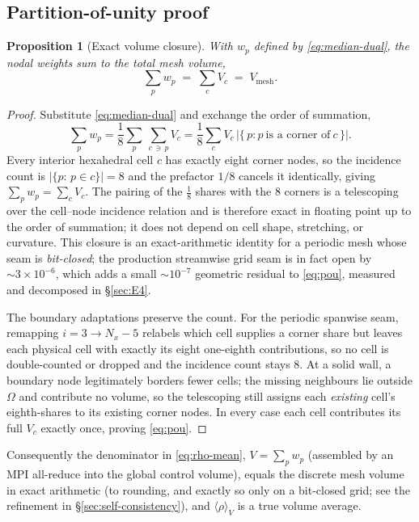 \documentclass[11pt]{article}
\newtheorem{proposition}{Proposition}
\theoremstyle{definition}
\theoremstyle{remark}
\begin{document}
\subsection{Partition-of-unity proof}
\label{sec:T3-pou}
\begin{proposition}[Exact volume closure]
\label{prop:pou}
With $w_p$ defined by \eqref{eq:median-dual}, the nodal weights sum to the total
mesh volume,
\begin{equation}
\sum_{p} w_p \;=\; \sum_{c} V_c \;=\; V_{\mathrm{mesh}} .
\label{eq:pou}
\end{equation}
\end{proposition}
\begin{proof}
Substitute \eqref{eq:median-dual} and exchange the order of summation,
\begin{equation}
\sum_{p} w_p
=\frac{1}{8}\sum_{p}\ \sum_{c\,\ni\,p} V_c
=\frac{1}{8}\sum_{c} V_c\,\bigl|\{\,p : p\ \text{is a corner of}\ c\,\}\bigr| .
\label{eq:pou-swap}
\end{equation}
Every interior hexahedral cell $c$ has exactly eight corner nodes, so the
incidence count is $|\{p:\,p\in c\}|=8$ and the prefactor $1/8$ cancels it
identically, giving $\sum_p w_p=\sum_c V_c$. The pairing of the $\tfrac18$ shares
with the $8$ corners is a telescoping over the cell--node incidence relation and
is therefore exact in floating point up to the order of summation; it does not
depend on cell shape, stretching, or curvature. This closure is an
exact-arithmetic identity for a periodic mesh whose seam is \emph{bit-closed};
the production streamwise grid seam is in fact open by $\sim\!3\times10^{-6}$,
which adds a small $\sim\!10^{-7}$ geometric residual to \eqref{eq:pou},
measured and decomposed in \S\ref{sec:E4}.

The boundary adaptations preserve the count. For the periodic spanwise seam,
remapping $i=3\to N_x{-}5$ relabels which cell supplies a corner share but leaves
each physical cell with exactly its eight one-eighth contributions, so no cell is
double-counted or dropped and the incidence count stays $8$. At a solid wall, a
boundary node legitimately borders fewer cells; the missing neighbours lie
outside $\Omega$ and contribute no volume, so the telescoping still assigns each
\emph{existing} cell's eighth-shares to its existing corner nodes. In every case
each cell contributes its full $V_c$ exactly once, proving \eqref{eq:pou}.
\end{proof}
Consequently the denominator in \eqref{eq:rho-mean}, $V=\sum_p w_p$ (assembled by
an MPI all-reduce into the global control volume), equals the discrete mesh
volume in exact arithmetic (to rounding, and exactly so only on a bit-closed
grid; see the refinement in \S\ref{sec:self-consistency}), and
$\langle\rho\rangle_V$ is a true volume average.
\end{document}
